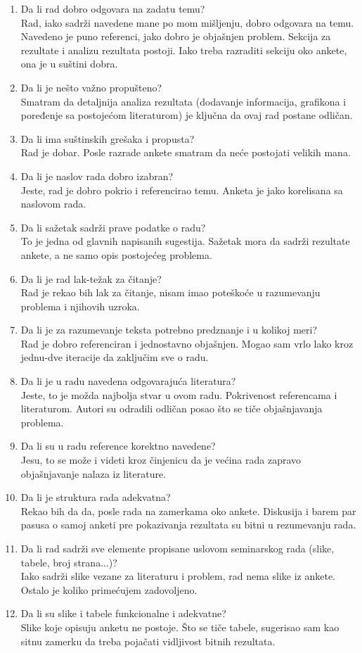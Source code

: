 \documentclass[a4paper]{report}
\begin{document}
\begin{enumerate}
\item Da li rad dobro odgovara na zadatu temu?\\
Rad, iako sadrži navedene mane po mom mišljenju, dobro odgovara na temu. Navedeno je puno referenci, jako dobro je objašnjen problem. Sekcija za rezultate i analizu rezultata postoji. Iako treba razraditi sekciju oko ankete, ona je u suštini dobra.
\item Da li je nešto važno propušteno?\\
Smatram da detaljnija analiza rezultata (dodavanje informacija, grafikona i poređenje sa postojećom literaturom) je ključna da ovaj rad postane odličan. 
\item Da li ima suštinskih grešaka i propusta?\\
Rad je dobar. Posle razrade ankete smatram da neće postojati velikih mana. 
\item Da li je naslov rada dobro izabran?\\
Jeste, rad je dobro pokrio i referencirao temu. Anketa je jako korelisana sa naslovom rada.
\item Da li sažetak sadrži prave podatke o radu?\\
To je jedna od glavnih napisanih sugestija. Sažetak mora da sadrži rezultate ankete, a ne samo opis postojećeg problema. 
\item Da li je rad lak-težak za čitanje?\\
Rad je rekao bih lak za čitanje, nisam imao poteškoće u razumevanju problema i njihovih uzroka.
\item Da li je za razumevanje teksta potrebno predznanje i u kolikoj meri?\\
Rad je dobro referenciran i jednostavno objašnjen. Mogao sam vrlo lako kroz jednu-dve iteracije da zaključim sve o radu.
\item Da li je u radu navedena odgovarajuća literatura?\\
Jeste, to je možda najbolja stvar u ovom radu. Pokrivenost referencama i literaturom. Autori su odradili odličan posao što se tiče objašnjavanja problema.
\item Da li su u radu reference korektno navedene?\\
Jesu, to se može i videti kroz činjenicu da je većina rada zapravo objašnjavanje nalaza iz literature.
\item Da li je struktura rada adekvatna?\\
Rekao bih da da, posle rada na zamerkama oko ankete. Diskusija i barem par pasusa o samoj anketi pre pokazivanja rezultata su bitni u rezumevanju rada.
\item Da li rad sadrži sve elemente propisane uslovom seminarskog rada (slike, tabele, broj strana...)?\\
Iako sadrži slike vezane za literaturu i problem, rad nema slike iz ankete. Ostalo je koliko primećujem zadovoljeno.
\item Da li su slike i tabele funkcionalne i adekvatne?\\
Slike koje opisuju anketu ne postoje. Što se tiče tabele, sugerisao sam kao sitnu zamerku da treba pojačati vidljivost bitnih rezultata.
\end{enumerate}
\end{document}
